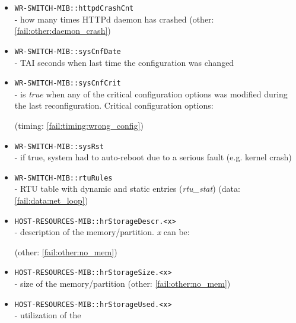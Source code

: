\begin{itemize}[leftmargin=0pt]
	\item [] \texttt{WR-SWITCH-MIB::httpdCrashCnt}\\ - how many times HTTPd daemon
		has crashed (other: \ref{fail:other:daemon_crash})
	\item [] \texttt{WR-SWITCH-MIB::sysCnfDate}\\ - TAI seconds when last
		time the configuration was changed
	\item [] \texttt{WR-SWITCH-MIB::sysCnfCrit}\\ - is \emph{true} when any of
		the critical configuration options was modified during the last
		reconfiguration. Critical configuration options:
		(timing: \ref{fail:timing:wrong_config})
	\item [] \texttt{WR-SWITCH-MIB::sysRst}\\ - if true, system had to auto-reboot
		due to a serious fault (e.g. kernel crash)
	\item [] \texttt{WR-SWITCH-MIB::rtuRules}\\ - RTU table with dynamic and
		static entries (\emph{rtu\_stat}) (data: \ref{fail:data:net_loop})
	\item [] \texttt{HOST-RESOURCES-MIB::hrStorageDescr.<x>}\\ - description of
		the memory/partition. \emph{x} can be:
		(other: \ref{fail:other:no_mem})
	\item [] \texttt{HOST-RESOURCES-MIB::hrStorageSize.<x>}\\ - size of the
		memory/partition (other: \ref{fail:other:no_mem})
	\item [] \texttt{HOST-RESOURCES-MIB::hrStorageUsed.<x>}\\ - utilization of the

\end{itemize}
